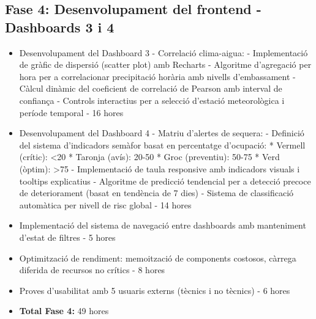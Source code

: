 \subsection{Fase 4: Desenvolupament del frontend - Dashboards 3 i 4}
\begin{itemize}
    \item Desenvolupament del Dashboard 3 - Correlació clima-aigua:
          - Implementació de gràfic de dispersió (scatter plot) amb Recharts
          - Algoritme d'agregació per hora per a correlacionar precipitació horària amb nivells d'embassament
          - Càlcul dinàmic del coeficient de correlació de Pearson amb interval de confiança
          - Controls interactius per a selecció d'estació meteorològica i període temporal - 16 hores
    \item Desenvolupament del Dashboard 4 - Matriu d'alertes de sequera:
          - Definició del sistema d'indicadors semàfor basat en percentatge d'ocupació:
            * Vermell (crític): <20%
            * Taronja (avís): 20-50%
            * Groc (preventiu): 50-75%
            * Verd (òptim): >75%
          - Implementació de taula responsive amb indicadors visuals i tooltips explicatius
          - Algoritme de predicció tendencial per a detecció precoce de deteriorament (basat en tendència de 7 dies)
          - Sistema de classificació automàtica per nivell de risc global - 14 hores
    \item Implementació del sistema de navegació entre dashboards amb manteniment d'estat de filtres - 5 hores
    \item Optimització de rendiment: memoització de components costosos, càrrega diferida de recursos no crítics - 8 hores
    \item Proves d'usabilitat amb 5 usuaris externs (tècnics i no tècnics) - 6 hores
    \item \textbf{Total Fase 4:} 49 hores
\end{itemize}

